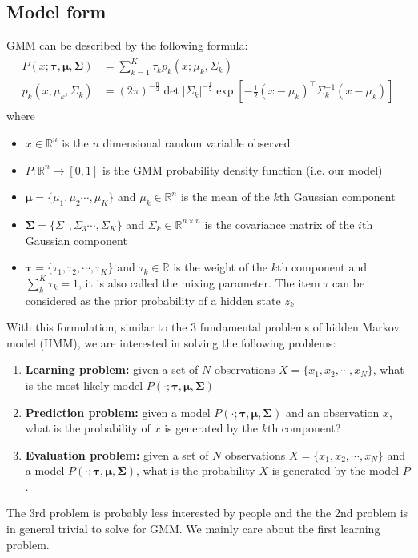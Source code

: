 \documentclass{article} [10pt] %
\begin{document}
\subsection{Model form}
GMM can be described by the following formula:
\begin{align} \label{eq:gmm_form1}
\begin{split}
	P(x; \boldsymbol{\tau}, \boldsymbol\mu, \boldsymbol\Sigma) &= \sum_{k=1}^K \tau_k p_k(x; \mu_k, \Sigma_k)\\
	p_k(x; \mu_k, \Sigma_k) &= (2\pi)^{-\frac{n}{2}}\det |\Sigma_k|^{-\frac{1}{2}}\exp\left[-\frac{1}{2}(x-\mu_k)^\top\Sigma_k^{-1}(x-\mu_k)\right]
\end{split}
\end{align}
where
\begin{itemize}
	\item $x\in \mathbb{R}^n$ is the $n$ dimensional random variable observed
	\item $P:\mathbb{R}^n\rightarrow [0, 1]$ is the GMM probability density function (i.e. our model)
	\item $\boldsymbol\mu=\{\mu_1, \mu_2\cdots, \mu_K\}$ and $\mu_k \in \mathbb{R}^n$ is the mean of the $k$th Gaussian component
	\item $\boldsymbol\Sigma=\{\Sigma_1, \Sigma_3\cdots, \Sigma_K\}$ and $\Sigma_k\in\mathbb{R}^{n \times n}$ is the covariance matrix of the $i$th Gaussian component
	\item $\boldsymbol\tau=\{\tau_1,\tau_2,\cdots, \tau_K\}$ and $\tau_k\in\mathbb{R}$ is the weight of the $k$th component and $\sum_k^K\tau_k=1$, it is also called the mixing parameter. The item $\tau$ can be considered as the prior probability of a hidden state $z_k$
\end{itemize}
With this formulation, similar to the 3 fundamental problems of hidden Markov model (HMM), we are interested in solving the following problems:
\begin{enumerate}
	\item\textbf{Learning problem:} given a set of $N$ observations $X=\{x_1, x_2,\cdots,x_N\}$, what is the most likely model $P(\cdot; \boldsymbol{\tau}, \boldsymbol\mu, \boldsymbol\Sigma)$
	\item\textbf{Prediction problem:} given a model $P(\cdot; \boldsymbol{\tau}, \boldsymbol\mu, \boldsymbol\Sigma)$ and an observation $x$, what is the probability of $x$ is generated by the $k$th component?
	\item\textbf{Evaluation problem:} given a set of $N$ observations $X=\{x_1, x_2,\cdots,x_N\}$ and a model $P(\cdot; \boldsymbol{\tau}, \boldsymbol\mu, \boldsymbol\Sigma)$, what is the probability $X$ is generated by the model $P$.
\end{enumerate}
The 3rd problem is probably less interested by people and the the 2nd problem is in general trivial to solve for GMM. We mainly care about the first learning problem.
\end{document}
